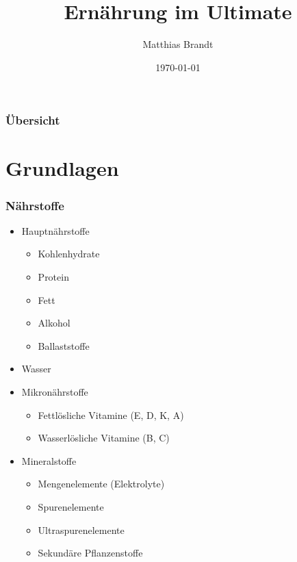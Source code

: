 \documentclass[ngerman, aspectratio=169]{beamer}
\title{Ernährung im Ultimate}
\date{\today}
\author[M. Brandt]{Matthias Brandt}
\institute{Deutscher\par Frisbeesport-Verband e.V.}
\begin{document}
\begin{frame}
  \titlepage
\end{frame}

\begin{frame}
  \frametitle{Übersicht}
  \tableofcontents
\end{frame}

\section{Grundlagen}
\begin{frame}
  \frametitle{Nährstoffe}
  \begin{multicols}{2}
    \begin{itemize}
      
    \item Hauptnährstoffe
      \begin{itemize}
      \item Kohlenhydrate
      \item Protein
      \item Fett
      \item Alkohol
      \item Ballaststoffe
      \end{itemize}
      
    \item Wasser
      
      \vfill\null
      \columnbreak
      
    \item Mikronährstoffe
      \begin{itemize}
      \item Fettlösliche Vitamine (E, D, K, A)
      \item Wasserlösliche Vitamine (B, C)
      \end{itemize}
      
    \item Mineralstoffe
      \begin{itemize}
      \item Mengenelemente (Elektrolyte)
      \item Spurenelemente
      \item Ultraspurenelemente
      \item Sekundäre Pflanzenstoffe
      \end{itemize}

    \end{itemize}
    
  \end{multicols}
  
\end{frame}
\end{document}
